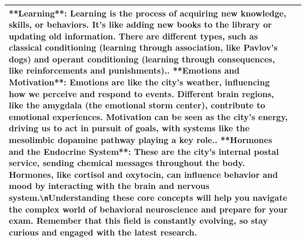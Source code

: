 \documentclass{article} %
\begin{document}
\begin{center}
\begin{longtable}{p{2.8cm}|p{10cm}}
**Learning**: Learning is the process of acquiring new knowledge, skills, or behaviors. It's like adding new books to the library or updating old information. There are different types, such as classical conditioning (learning through association, like Pavlov's dogs) and operant conditioning (learning through consequences, like reinforcements and punishments).\newline 9. **Emotions and Motivation**: Emotions are like the city's weather, influencing how we perceive and respond to events. Different brain regions, like the amygdala (the emotional storm center), contribute to emotional experiences. Motivation can be seen as the city's energy, driving us to act in pursuit of goals, with systems like the mesolimbic dopamine pathway playing a key role.\newline 10. **Hormones and the Endocrine System**: These are the city's internal postal service, sending chemical messages throughout the body. Hormones, like cortisol and oxytocin, can influence behavior and mood by interacting with the brain and nervous system.\verb|\n|\newline Understanding these core concepts will help you navigate the complex world of behavioral neuroscience and prepare for your exam. Remember that this field is constantly evolving, so stay curious and engaged with the latest research.   \\ \midrule

\end{longtable}
\end{center}
\end{document}
